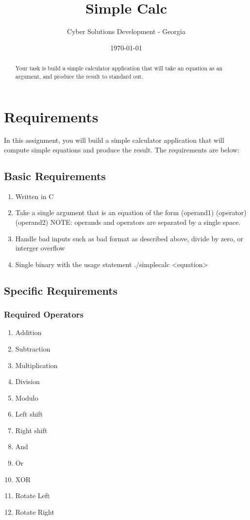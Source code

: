 \documentclass[letterpaper,12pt]{article}
\begin{document}
	
	\title{Simple Calc}
	\author{Cyber Solutions Development - Georgia}
	\date{\today}
	\maketitle
	
	\begin{abstract}
		Your task is build a simple calculator application that will take an equation as an argument, and produce the result to standard out.
	\end{abstract}
	
	
	\section{Requirements}
	
	In this assignment, you will build a simple calculator application that will compute simple equations and produce the result. The requirements are below:
	
	\subsection{Basic Requirements}
		\begin{enumerate}
			\item Written in C
			\item Take a single argument that is an equation of the form (operand1) (operator) (operand2) 
			\subitem NOTE: operands and operators are separated by a single space.
			\item Handle bad inputs such as bad format as described above, divide by zero, or interger overflow
			\item Single binary with the usage statement ./simplecalc <equation>
		\end{enumerate}
	
	\subsection{Specific Requirements}
	\subsubsection{Required Operators}
		\begin{enumerate}
			\item Addition 
			\item Subtraction
			\item Multiplication
			\item Division
			\item Modulo 
			\item Left shift 
			\item Right shift 
			\item And
			\item Or
			\item XOR
			\item Rotate Left
			\item Rotate Right
		\end{enumerate}
	
\end{document}
